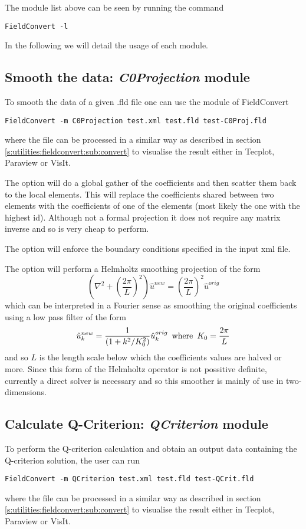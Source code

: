 The module list above can be seen by running the command
%
\begin{lstlisting}[style=BashInputStyle]
FieldConvert -l 
\end{lstlisting}
%
In the following we will detail the usage of each module.
%
%
%

\subsection{Smooth the data: \textit{C0Projection} module}
To smooth the data of a given .fld file one can 
use the  module of FieldConvert
%
\begin{lstlisting}[style=BashInputStyle]
FieldConvert -m C0Projection test.xml test.fld test-C0Proj.fld
\end{lstlisting}
%
where the file  can be processed in a similar 
way as described in section \ref{s:utilities:fieldconvert:sub:convert}
to visualise the result either in Tecplot, Paraview or VisIt.

The option  will do a global gather of the
coefficients and then scatter them back to the local elements. This
will replace the coefficients shared between two elements with the
coefficients of one of the elements (most likely the one with the
highest id). Although not a formal projection it does not require any
matrix inverse and so is very cheap to perform.

The option  will enforce the boundary conditions
specified in the input xml file.

The option  will perform a Helmholtz
smoothing projection of the form
\[
\left (\nabla^2 + \left (\frac{2 \pi}{L}\right )^2 \right ) \hat{u}^{new} =
\left (\frac{2 \pi}{L}\right )^2 \hat{u}^{orig}
\]
which can be interpreted in a Fourier sense as smoothing the original
coefficients using a low pass filter of the form
\[
\hat{u}_k^{new} = \frac{1}{(1 + k^2/K_0^2)} \hat{u}_k^{orig} \mbox{\,  where  \,}
K_0 = \frac{2 \pi}{L}
\]
and so $L$ is the length scale below which the coefficients values are
halved or more. Since this form of the Helmholtz operator is not
possitive definite, currently a direct solver is necessary and so this
smoother is mainly of use in two-dimensions.

\subsection{Calculate Q-Criterion: \textit{QCriterion} module}
To perform the Q-criterion calculation and obtain an output 
data containing the Q-criterion solution, the user can run
%
\begin{lstlisting}[style=BashInputStyle]
FieldConvert -m QCriterion test.xml test.fld test-QCrit.fld
\end{lstlisting}
%
where the file  can be processed in a similar 
way as described in section \ref{s:utilities:fieldconvert:sub:convert}
to visualise the result either in Tecplot, Paraview or VisIt.
%
%
%

